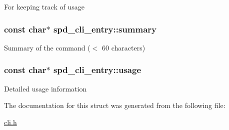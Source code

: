 \label{structspd__cli__entry_a81ccbdf325956499ab2020bcf6adea7b}
For keeping track of usage \hypertarget{structspd__cli__entry_aea9782355ada46b1dde2b29432611d91}{
\subsubsection[{summary}]{\setlength{\rightskip}{0pt plus 5cm}const char$\ast$ {\bf spd\_\-cli\_\-entry::summary}}}
\label{structspd__cli__entry_aea9782355ada46b1dde2b29432611d91}
Summary of the command ($<$ 60 characters) \hypertarget{structspd__cli__entry_a2f3d729e3a87a6056df8376b672a6fbd}{
\subsubsection[{usage}]{\setlength{\rightskip}{0pt plus 5cm}const char$\ast$ {\bf spd\_\-cli\_\-entry::usage}}}
\label{structspd__cli__entry_a2f3d729e3a87a6056df8376b672a6fbd}
Detailed usage information 

The documentation for this struct was generated from the following file:\begin{DoxyCompactItemize}
\item 
\hyperlink{cli_8h}{cli.h}\end{DoxyCompactItemize}
